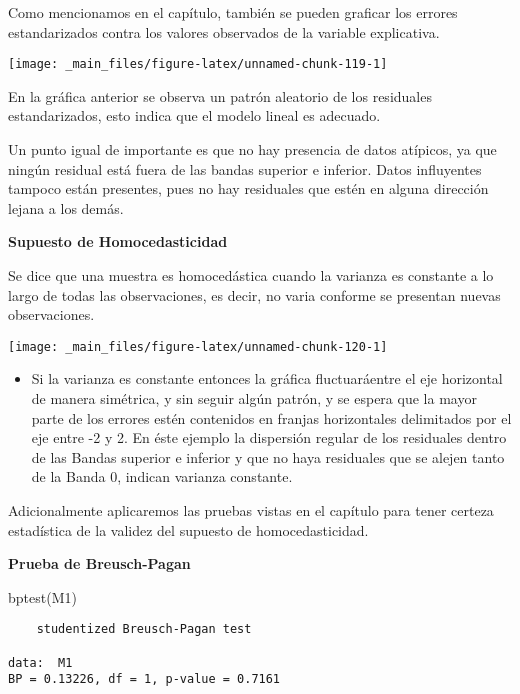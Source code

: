 \documentclass[
  a4paper,
  oneside,
  openany]{book}
\newenvironment{Shaded}{\begin{snugshade}}{\end{snugshade}}
\newcommand{\FunctionTok}[1]{\textcolor[rgb]{0.00,0.00,0.00}{#1}}
\newcommand{\NormalTok}[1]{#1}
\providecommand{\tightlist}{%
  \setlength{\itemsep}{0pt}\setlength{\parskip}{0pt}}
\begin{document}
Como mencionamos en el capítulo, también se pueden graficar los errores estandarizados contra los valores observados de la variable explicativa.

\begin{center}\texttt{[image: \_main\_files/figure-latex/unnamed-chunk-119-1]} \end{center}

En la gráfica anterior se observa un patrón aleatorio de los residuales estandarizados, esto indica que el modelo lineal es adecuado.

Un punto igual de importante es que no hay presencia de datos atípicos, ya que ningún residual está fuera de las bandas superior e inferior. Datos influyentes tampoco están presentes, pues no hay residuales que estén en alguna dirección lejana a los demás.

\textbf{Supuesto de Homocedasticidad}

Se dice que una muestra es homocedástica cuando la varianza es constante a lo largo de todas las observaciones, es decir, no varia conforme se presentan nuevas observaciones.

\begin{center}\texttt{[image: \_main\_files/figure-latex/unnamed-chunk-120-1]} \end{center}

\begin{itemize}
\tightlist
\item
  Si la varianza es constante entonces la gráfica fluctuaráentre el eje horizontal de manera simétrica, y sin seguir algún patrón, y se espera que la mayor parte de los errores estén contenidos en franjas horizontales delimitados por el eje entre -2 y 2. En éste ejemplo la dispersión regular de los residuales dentro de las Bandas superior e inferior y que no haya residuales que se alejen tanto de la Banda 0, indican varianza constante.
\end{itemize}

Adicionalmente aplicaremos las pruebas vistas en el capítulo para tener certeza estadística de la validez del supuesto de homocedasticidad.

\textbf{Prueba de Breusch-Pagan}

\begin{Shaded}
\begin{Highlighting}[]
\FunctionTok{bptest}\NormalTok{(M1)}
\end{Highlighting}
\end{Shaded}

\begin{verbatim}
    studentized Breusch-Pagan test

data:  M1
BP = 0.13226, df = 1, p-value = 0.7161
\end{verbatim}
\end{document}
